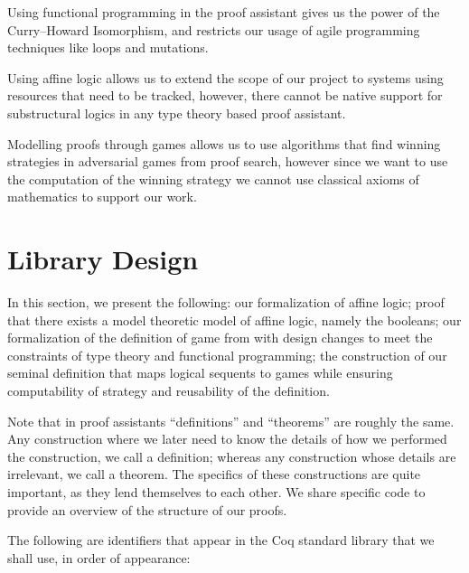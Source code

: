 \documentclass{article}
\theoremstyle{definition}
\begin{document}
Using functional programming in the proof assistant gives us the power of the Curry--Howard Isomorphism, and restricts our usage of agile programming techniques like loops and mutations.


Using affine logic allows us to extend the scope of our project to systems using resources that need to be tracked, however, there cannot be native support for substructural logics in any type theory based proof assistant.


Modelling proofs through games allows us to use algorithms that find winning strategies in adversarial games from proof search, however since we want to use the computation of the winning strategy we cannot use classical axioms of mathematics to support our work.

\section{Library Design}

In this section, we present the following: our formalization of affine logic; proof that there exists a model theoretic model of affine logic, namely the booleans; our formalization of the definition of game from \textcite{Blass1992} with design changes to meet the constraints of type theory and functional programming; the construction of our seminal definition that maps logical sequents to games while ensuring computability of strategy and reusability of the definition. 

Note that in proof assistants ``definitions'' and ``theorems'' are roughly the same. Any construction where we later need to know the details of how we performed the construction, we call a definition; whereas any construction whose details are irrelevant, we call a theorem. The specifics of these constructions are quite important, as they lend themselves to each other. We share specific code to provide an overview of the structure of our proofs. 

The following are identifiers that appear in the Coq standard library that we shall use, in order of appearance:
\end{document}
